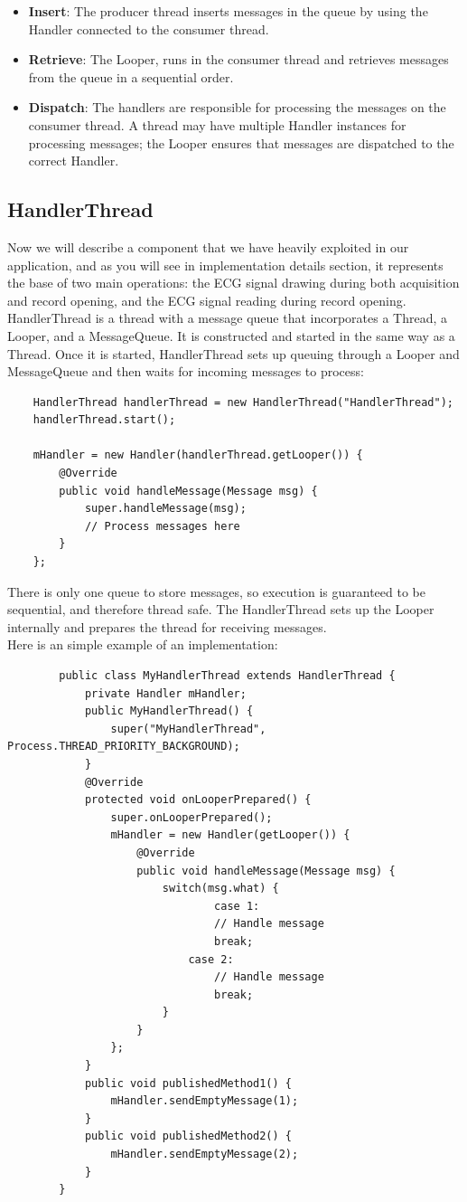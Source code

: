 \begin{itemize}
	\item \textbf{Insert}: The producer thread inserts messages in the queue by using the Handler connected to the consumer thread.
	\item \textbf{Retrieve}: The Looper, runs in the consumer thread and retrieves messages from the queue in a sequential order.
	\item \textbf{Dispatch}: The handlers are responsible for processing the messages on the consumer thread. A thread may have multiple Handler instances for processing messages; the Looper ensures that messages are dispatched to the correct Handler.
\end{itemize}

\subsection{HandlerThread}
Now we will describe a component that we have heavily exploited in our application, and as you will see in implementation details section, it represents the base of two main operations: the ECG signal drawing during both acquisition and record opening, and the ECG signal reading during record opening.\\
HandlerThread is a thread with a message queue that incorporates a Thread, a Looper, and a MessageQueue. It is constructed and started in the same way as a Thread. Once it is started, HandlerThread sets up queuing through a Looper and MessageQueue and then waits for incoming messages to process:
\begin{lstlisting}
	HandlerThread handlerThread = new HandlerThread("HandlerThread");
	handlerThread.start();
	
	mHandler = new Handler(handlerThread.getLooper()) {
		@Override
		public void handleMessage(Message msg) {
			super.handleMessage(msg);
			// Process messages here
		}
	};
\end{lstlisting}
There is only one queue to store messages, so execution is guaranteed to be sequential, and therefore thread safe. The HandlerThread sets up the Looper internally and prepares the thread for receiving messages.\\
Here is an simple example of an implementation:
\begin{lstlisting}
        public class MyHandlerThread extends HandlerThread {
	        private Handler mHandler;
	        public MyHandlerThread() {
		        super("MyHandlerThread", Process.THREAD_PRIORITY_BACKGROUND);
	        }
	        @Override
	        protected void onLooperPrepared() {
		        super.onLooperPrepared();
		        mHandler = new Handler(getLooper()) {
			        @Override
			        public void handleMessage(Message msg) {
				        switch(msg.what) {
								case 1:
						        // Handle message
						        break;
					        case 2:
						        // Handle message
						        break;
				        }
				    }
			    };
	        }
	        public void publishedMethod1() {
		        mHandler.sendEmptyMessage(1);
	        }
	        public void publishedMethod2() {
		        mHandler.sendEmptyMessage(2);
	        }
        }
\end{lstlisting}

